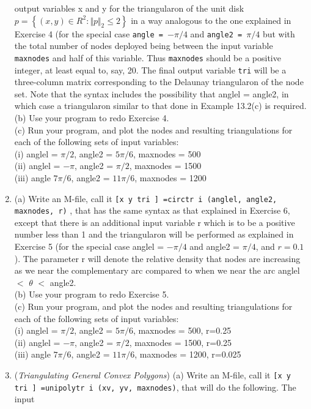 \documentclass[../main.tex]{subfiles}
\begin{document}
\begin{enumerate}
output variables x and y for the triangularon of the unit disk $p = \left\{(x,y) \in  R^2 : \Vert p \Vert_2 \leqslant 2 \right\}$ in a 
way analogous to the one explained in Exercise 4 (for the special case \texttt{angle = $-\pi/4$} and 
\texttt{angle2 = $\pi/4$} but with the total number of nodes deployed being between the input variable 
\texttt{maxnodes} and half of this variable. Thus \texttt{maxnodes} should be a positive integer, at least 
equal to, say, 20. The final output variable \texttt{tri} will be a three-column matrix corresponding to 
the Delaunay triangularon of the node set. Note that the syntax includes the possibility that 
anglel = angle2, in which case a triangularon similar to that done in Example 13.2(c) is 
required.
\\
(b) Use your program to redo Exercise 4.
\\
(c) Run your program, and plot the nodes and resulting triangulations for each of the following 
sets of input variables: 
\\
(i) anglel = $\pi/2$, angle2 = $5\pi/6$, maxnodes = 500 
\\
(ii) anglel = $-\pi$, angle2 = $\pi/2$, maxnodes = 1500 
\\
(iii) angle $7\pi/6$, angle2 = $11\pi/6$, maxnodes = 1200 
	\item (a) Write an M-file, call it \texttt{[x y tri ] =circtr i (anglel, angle2, maxnodes, r)} , that has the same syntax as that explained in Exercise 6, except that there is an additional 
input variable r which is to be a positive number less than 1 and the triangularon will be 
performed as explained in Exercise 5 (for the special case anglel = $-\pi/4$ and angle2 = $\pi/4$, 
and $r = 0.1$). The parameter r will denote the relative density that nodes are increasing as we 
near the complementary arc compared to when we near the arc anglel $<$ $\theta$ $<$ angle2.
\\ 
(b) Use your program to redo Exercise 5. 
\\
(c) Run your program, and plot the nodes and resulting triangulations for each of the following 
sets of input variables: 
\\
(i) anglel = $\pi/2$, angle2 = $5\pi/6$, maxnodes = 500, r=0.25
\\
(ii) anglel = $-\pi$, angle2 = $\pi/2$, maxnodes = 1500, r=0.25
\\
(iii) angle $7\pi/6$, angle2 = $11\pi/6$, maxnodes = 1200, r=0.025
	\item (\textit{Triangulating General Convex Polygons}) (a) Write an M-file, call it \texttt{[x y tri ] =unipolytr i (xv, yv, maxnodes)}, that will do the following. The input 

\end{enumerate}
\end{document}
